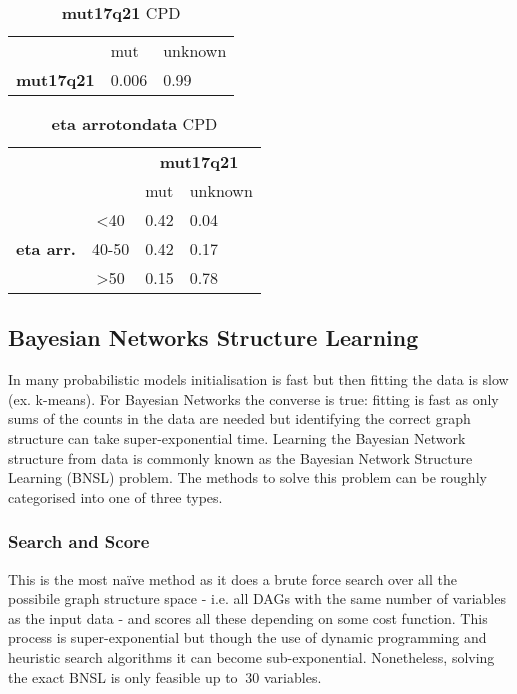 \begin{table*}[htbp]
\centering
\caption{\textbf{mut17q21} CPD}
\begin{tabularx}{\textwidth/2}{cXX}
\toprule
& mut & unknown    \\ 
\textbf{mut17q21} & 0.006 & 0.99  \\
\bottomrule
\end{tabularx}
\label{tab:mut-cpd}
\end{table*}

\begin{table*}[htbp]
\centering
\caption{\textbf{eta arrotondata} CPD}
\begin{tabularx}{\textwidth/2}{ccXX}
\toprule
      & &  \multicolumn{2}{c}{\textbf{mut17q21}} \\
\cmidrule(lr){3-4}
 & & mut & unknown    \\ 
 \multirow{3}{*}{\textbf{eta arr.}}  & <40 & 0.42 & 0.04  \\
 & 40-50 & 0.42 & 0.17    \\
 & >50 & 0.15 & 0.78 \\
\bottomrule
\end{tabularx}
\label{tab:eta-cpd}
\end{table*}

\subsection{Bayesian Networks Structure Learning} \label{subsec:bnstructurelearning} 
In many probabilistic models initialisation is fast but then fitting the data is slow (ex. k-means).
For Bayesian Networks the converse is true: fitting is fast as only sums of the counts in the data are needed but identifying the correct graph structure can take super-exponential time.
Learning the Bayesian Network structure from data is commonly known as the Bayesian Network Structure Learning (BNSL) problem.
The methods to solve this problem can be roughly categorised into one of three types.

\subsubsection{Search and Score}
This is the most na{\"i}ve method as it does a brute force search over all the possibile graph structure space - i.e. all DAGs with the same number of variables as the input data - and scores all these depending on some cost function.
This process is super-exponential but though the use of dynamic programming and heuristic search algorithms it can become sub-exponential.
Nonetheless, solving the exact BNSL is only feasible up to $~ 30$ variables.

